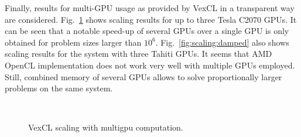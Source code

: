 \documentclass[final]{siamltex}
\newcommand{\figref}[1]{Fig.~\ref{#1}}
\begin{document}
Finally, results for multi-GPU usage as provided by VexCL in a transparent way are considered.
\figref{fig:scaling} shows scaling results for up to three Tesla C2070 GPUs.
It can be seen that a notable speed-up of several GPUs over a single GPU is only obtained for problem sizes
larger than $10^6$.
\figref{fig:scaling:damped} also shows scaling results for the system with three Tahiti GPUs. %
It seems that AMD OpenCL
implementation does not work very well with multiple GPUs employed. Still,
combined memory of several GPUs allows to solve proportionally larger problems
on the same system.

\begin{figure}
    \begin{center}
        $\;$
        $\;$
    \end{center}
    \caption{VexCL scaling with multigpu computation.}
    \label{fig:scaling}
\end{figure}
\end{document}

